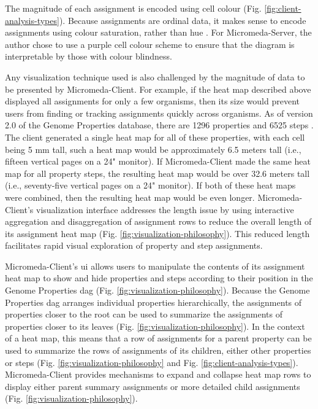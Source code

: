 The magnitude of each assignment is encoded using cell colour (Fig. \ref{fig:client-analysis-types}). Because assignments are ordinal data, it makes sense to encode assignments using colour saturation, rather than hue \cite{munzner2015visualization}. For Micromeda-Server, the author chose to use a purple cell colour scheme to ensure that the diagram is interpretable by those with colour blindness.

Any visualization technique used is also challenged by the magnitude of data to be presented by Micromeda-Client. For example, if the heat map described above displayed all assignments for only a few organisms, then its  size would prevent users from finding or tracking assignments quickly across organisms. As of version 2.0 of the Genome Properties database, there are 1296 properties and 6525 steps \cite{richardson2018genome}. The client generated a single heat map for all of these properties, with each cell being 5 mm tall, such a heat map would be approximately 6.5 meters tall (i.e., fifteen vertical pages on a 24" monitor). If Micromeda-Client made the same heat map for all property steps, the resulting heat map would be over 32.6 meters tall (i.e., seventy-five vertical pages on a 24" monitor). If both of these heat maps were combined, then the resulting heat map would be even longer. Micromeda-Client's visualization interface addresses the length issue by using interactive aggregation and disaggregation \cite{munzner2015visualization} of assignment rows to reduce the overall length of its assignment heat map (Fig. \ref{fig:visualization-philosophy}). This reduced length facilitates rapid visual exploration of property and step assignments.

Micromeda-Client's \gls{ui} allows users to manipulate the contents of its assignment heat map to show and hide properties and steps according to their position in the Genome Properties \gls{dag} \cite{richardson2018genome} (Fig. \ref{fig:visualization-philosophy}). Because the Genome Properties \gls{dag} arranges individual properties hierarchically, the assignments of properties closer to the root can be used to summarize the assignments of properties closer to its leaves (Fig. \ref{fig:visualization-philosophy}). In the context of a heat map, this means that a row of assignments for a parent property can be used to summarize the rows of assignments of its children, either other properties or steps (Fig. \ref{fig:visualization-philosophy} and Fig. \ref{fig:client-analysis-types}). Micromeda-Client provides mechanisms to expand and collapse heat map rows to display either parent summary assignments or more detailed child assignments (Fig. \ref{fig:visualization-philosophy}).

